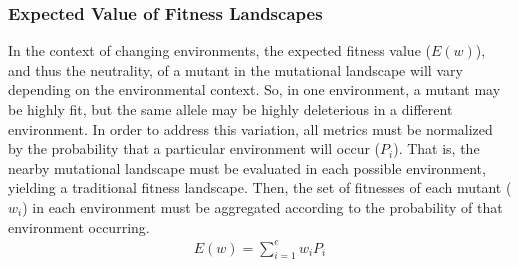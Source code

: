 \documentclass[PhD]{msu-thesis}
\begin{document}
\subsubsection*{Expected Value of Fitness Landscapes}
In the context of changing environments, the expected fitness value ($E(w)$), and thus the neutrality, of a mutant in the mutational landscape will vary depending on the environmental context. So, in one environment, a mutant may be highly fit, but the same allele may be highly deleterious in a different environment. In order to address this variation, all metrics must be normalized by the probability that a particular environment will occur ($P_i$). That is, the nearby mutational landscape must be evaluated in each possible environment, yielding a traditional fitness landscape. Then, the set of fitnesses of each mutant ($w_i$) in each environment must be aggregated according to the probability of that environment occurring.
\begin{eqnarray}
\label{eq:expected_fitness_value}
	E(w) = \displaystyle\sum_{i=1}^{e} w_i P_i
\end{eqnarray}





	
\end{document}
